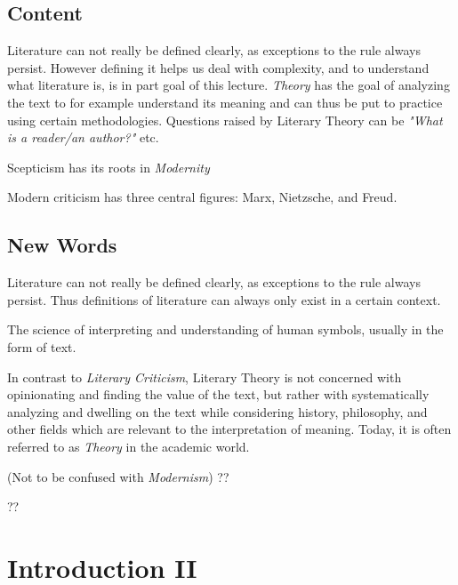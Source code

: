 \documentclass[]{scrartcl}
\begin{document}
\subsection{Content}

Literature can not really be defined clearly, as exceptions to the rule always persist. However defining it helps us deal with complexity, and to understand what literature is, is in part goal of this lecture. \emph{Theory} has the goal of analyzing the text to for example understand its meaning and can thus be put to practice using certain methodologies. Questions raised by Literary Theory can be \emph{"What is a reader/an author?"} etc.

Scepticism has its roots in \emph{Modernity}

Modern criticism has three central figures: Marx, Nietzsche, and Freud.  

\subsection{New Words}

\begin{description}[leftmargin=!,labelwidth=\widthof{\bfseries Literary Theory}]
  \item[Literature] Literature can not really be defined clearly, as exceptions to the rule always persist. Thus definitions of literature can always only exist in a certain context.
  \item[Hermeneutics] The science of interpreting and understanding of human symbols, usually in the form of text.
  \item[Literary Theory] In contrast to \emph{Literary Criticism}, Literary Theory is not concerned with opinionating and finding the value of the text, but rather with systematically analyzing and dwelling on the text while considering history, philosophy, and other fields which are relevant to the interpretation of meaning. Today, it is often referred to as \emph{Theory} in the academic world.
  \item[Modernity] (Not to be confused with \emph{Modernism}) ??
  \item[Cartesian Revolution] ??
\end{description}

\section{Introduction II}

\end{document}
